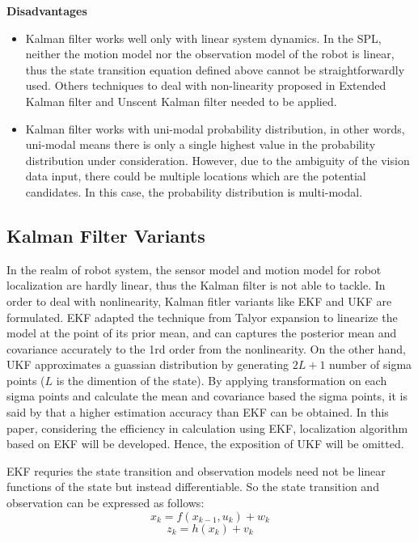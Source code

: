 \noindent\textbf{Disadvantages}
\begin{itemize}
  \item  Kalman filter works well only with linear system dynamics. In the SPL, neither the motion model nor the observation model of the robot is linear, thus the state transition equation defined above cannot be straightforwardly used. Others techniques to deal with non-linearity proposed in Extended Kalman filter and Unscent Kalman filter needed to be applied.
  \item  Kalman filter works with uni-modal probability distribution, in other words, uni-modal means there is only a single highest value in the probability distribution under consideration. However, due to the ambiguity of the vision data input, there could be multiple locations which are the potential candidates. In this case, the probability distribution is multi-modal.
\end{itemize}

\subsection{Kalman Filter Variants}
In the realm of robot system, the sensor model and motion model for robot localization are hardly linear, thus the Kalman filter is not able to tackle. In order to deal with nonlinearity, Kalman fitler variants like \gls{EKF} and \gls{UKF} are formulated. \gls{EKF} adapted the technique from Talyor expansion to linearize the model at the point of its prior mean, and can captures the posterior mean and covariance accurately to the 1rd order from the nonlinearity. On the other hand, \gls{UKF} approximates a guassian distribution by generating $2L+1$ number of sigma points ($L$ is the dimention of the state). By applying transformation on each sigma points and calculate the mean and covariance based the sigma points, it is said by \cite{Wan2000} that a higher estimation accuracy than \gls{EKF} can be obtained. In this paper, considering the efficiency in calculation using \gls{EKF}, localization algorithm based on \gls{EKF} will be developed. Hence, the exposition of \gls{UKF} will be omitted.

\gls{EKF} requries the state transition and observation models need not be linear functions of the state but instead differentiable. So the state transition and observation can be expressed as follows: \\
$$x_{k} = f(x_{k-1}, u_{k}) + w_{k}$$ 
$$z_{k} = h(x_{k}) + v_{k}$$ 

